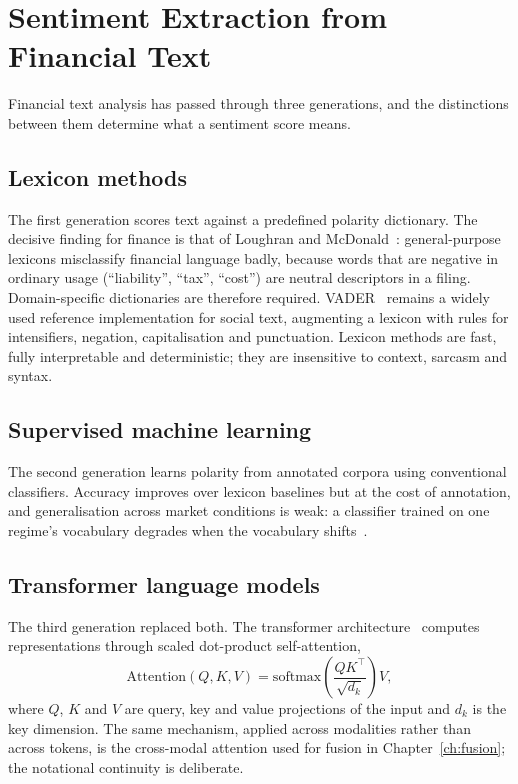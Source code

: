 \section{Sentiment Extraction from Financial Text}

Financial text analysis has passed through three generations, and the distinctions between them
determine what a sentiment score means.

\subsection{Lexicon methods}

The first generation scores text against a predefined polarity dictionary. The decisive finding
for finance is that of Loughran and McDonald~\cite{loughran2011}: general-purpose lexicons
misclassify financial language badly, because words that are negative in ordinary usage
(``liability'', ``tax'', ``cost'') are neutral descriptors in a filing. Domain-specific
dictionaries are therefore required. VADER~\cite{hutto2014} remains a widely used reference
implementation for social text, augmenting a lexicon with rules for intensifiers, negation,
capitalisation and punctuation. Lexicon methods are fast, fully interpretable and deterministic;
they are insensitive to context, sarcasm and syntax.

\subsection{Supervised machine learning}

The second generation learns polarity from annotated corpora using conventional classifiers.
Accuracy improves over lexicon baselines but at the cost of annotation, and generalisation
across market conditions is weak: a classifier trained on one regime's vocabulary degrades when
the vocabulary shifts~\cite{rouf2021}.

\subsection{Transformer language models}

The third generation replaced both. The transformer architecture~\cite{vaswani2017} computes
representations through scaled dot-product self-attention,
\begin{equation}
\mathrm{Attention}(Q,K,V) = \mathrm{softmax}\!\left(\frac{QK^{\!\top}}{\sqrt{d_k}}\right) V,
\end{equation}
where $Q$, $K$ and $V$ are query, key and value projections of the input and $d_k$ is the key
dimension. The same mechanism, applied across modalities rather than across tokens, is the
cross-modal attention used for fusion in Chapter~\ref{ch:fusion}; the notational continuity is
deliberate.

